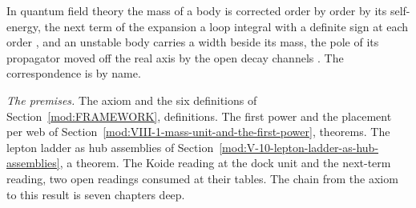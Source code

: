 \begin{chbridge}
In quantum field theory the mass of a body is corrected order by order by its self-energy, the next term of the expansion a loop integral with a definite sign at each order \cite{Weinberg1995}, and an unstable body carries a width beside its mass, the pole of its propagator moved off the real axis by the open decay channels \cite{BreitWigner1936}. The correspondence is by name.
\end{chbridge}
\begin{chproof}
\textit{The premises.} The axiom and the six definitions of Section~\ref{mod:FRAMEWORK}, definitions. The first power and the placement per web of Section~\ref{mod:VIII-1-mass-unit-and-the-first-power}, theorems. The lepton ladder as hub assemblies of Section~\ref{mod:V-10-lepton-ladder-as-hub-assemblies}, a theorem. The Koide reading at the dock unit and the next-term reading, two open readings consumed at their tables. The chain from the axiom to this result is seven chapters deep.


\end{chproof}
